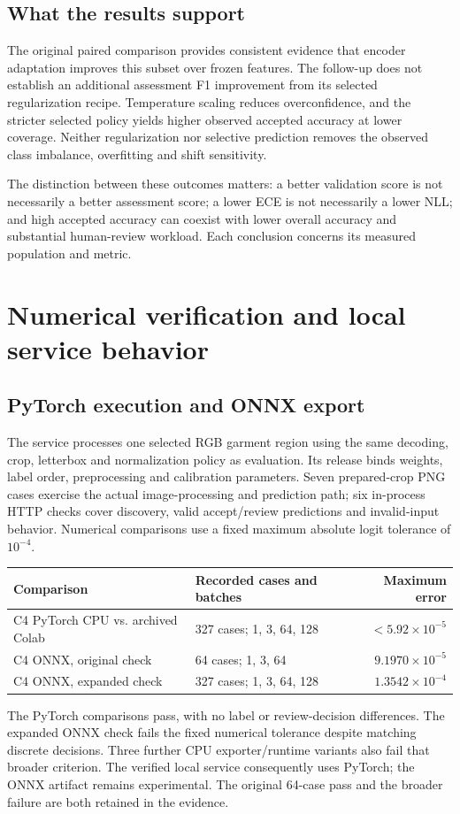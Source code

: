 \subsection{What the results support}
The original paired comparison provides consistent evidence that encoder adaptation improves this subset over frozen features. The follow-up does not establish an additional assessment F1 improvement from its selected regularization recipe. Temperature scaling reduces overconfidence, and the stricter selected policy yields higher observed accepted accuracy at lower coverage. Neither regularization nor selective prediction removes the observed class imbalance, overfitting and shift sensitivity.

The distinction between these outcomes matters: a better validation score is not necessarily a better assessment score; a lower ECE is not necessarily a lower NLL; and high accepted accuracy can coexist with lower overall accuracy and substantial human-review workload. Each conclusion concerns its measured population and metric.

\clearpage
\section{Numerical verification and local service behavior}
\subsection{PyTorch execution and ONNX export}
The service processes one selected RGB garment region using the same decoding, crop, letterbox and normalization policy as evaluation. Its release binds weights, label order, preprocessing and calibration parameters. Seven prepared-crop PNG cases exercise the actual image-processing and prediction path; six in-process HTTP checks cover discovery, valid accept/review predictions and invalid-input behavior. Numerical comparisons use a fixed maximum absolute logit tolerance of $10^{-4}$.

\begin{center}\small
\begin{tabular}{p{.43\linewidth}p{.30\linewidth}r}\toprule
Comparison & Recorded cases and batches & Maximum error\\\midrule
C4 PyTorch CPU vs. archived Colab & 327 cases; 1, 3, 64, 128 & $<5.92\times10^{-5}$\\
C4 ONNX, original check & 64 cases; 1, 3, 64 & $9.1970\times10^{-5}$\\
C4 ONNX, expanded check & 327 cases; 1, 3, 64, 128 & $1.3542\times10^{-4}$\\\bottomrule
\end{tabular}\end{center}
The PyTorch comparisons pass, with no label or review-decision differences. The expanded ONNX check fails the fixed numerical tolerance despite matching discrete decisions. Three further CPU exporter/runtime variants also fail that broader criterion. The verified local service consequently uses PyTorch; the ONNX artifact remains experimental. The original 64-case pass and the broader failure are both retained in the evidence.

